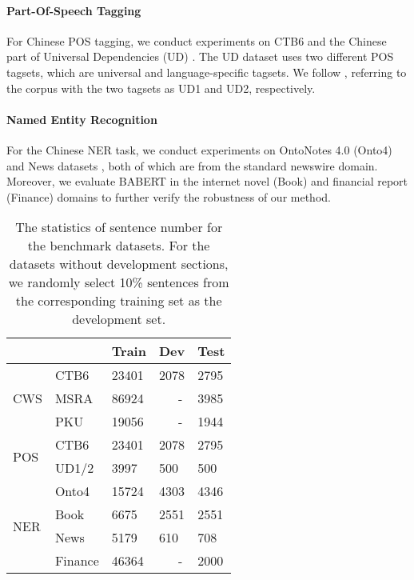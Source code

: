 \documentclass[11pt]{article}
\begin{document}
\begin{CJK}{UTF8}{gbsn}
\paragraph{Part-Of-Speech Tagging}
For Chinese POS tagging, we conduct experiments on CTB6 \cite{xue2005penn} and the Chinese part of Universal Dependencies (UD) \cite{nivre2016universal}.
The UD dataset uses two different POS tagsets, which are universal and language-specific tagsets.
We follow \citet{shao-etal-2017-character},
referring to the corpus with the two tagsets as UD1 and UD2, respectively.



\paragraph{Named Entity Recognition}
For the Chinese NER task, we conduct experiments on OntoNotes 4.0 (Onto4) \cite{weischedel2011ontonotes} and News datasets \cite{jia-etal-2020-entity}, both of which are from the standard newswire domain.
Moreover, we evaluate BABERT in the internet novel (Book) and financial report (Finance) domains \cite{jia-etal-2020-entity} to further verify the robustness of our method.


\begin{table}[]
  \centering
  {
\begin{tabular}{@{}ll|lll@{}}
  \toprule
                       &         & Train   & Dev   & Test   \\ \midrule
  \multirow{3}{*}{CWS} & CTB6    & 23401   & 2078  & 2795   \\
                       & MSRA    & 86924   & ~~~-  & 3985   \\
                       & PKU     & 19056   & ~~~-  & 1944   \\ \hline
  \multirow{2}{*}{POS} & CTB6    & 23401   & 2078  & 2795   \\
                       & UD1/2   & 3997    & 500   & 500    \\ \hline
  \multirow{4}{*}{NER} & Onto4    & 15724   & 4303  & 4346   \\
                       & Book    & 6675    & 2551  & 2551   \\
                       & News    & 5179    & 610   & 708    \\
                       & Finance & 46364   & ~~~-  & 2000   \\ \bottomrule
  \end{tabular}}
  \caption{
  The statistics of sentence number for the benchmark datasets.
  For the datasets without development sections, we randomly select 10\% sentences from the corresponding training set as the development set.
  }
  \label{tab:datasets}
\end{table}


\end{CJK}
\end{document}
